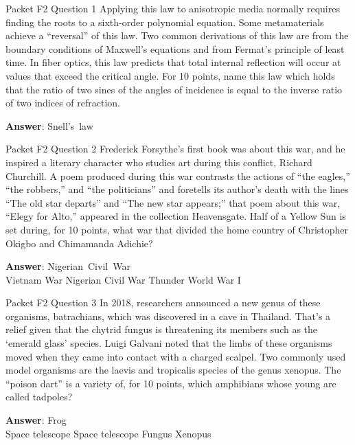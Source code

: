 \begin{frame}{Packet F2 Question 1}
Applying this law to anisotropic media normally     requires finding the roots to a sixth-order polynomial equation. Some metamaterials achieve a “reversal” of this law. Two common derivations of this law are from the boundary conditions of Maxwell’s equations and from Fermat’s principle of least time. In fiber optics, this law predicts that total internal reflection will occur at values     that exceed the critical angle. For 10 points, name this law which holds that the ratio of two sines of the angles of incidence is equal to the inverse ratio of two indices of refraction.

\textbf{Answer}: Snell's\ law\\
\end{frame}

\begin{frame}{Packet F2 Question 2}
Frederick Forsythe’s first book was about this war, and he inspired a literary character   who studies art during this conflict, Richard Churchill. A poem produced during this war contrasts the actions of “the eagles,” “the robbers,” and “the politicians” and foretells its author’s death with the lines “The old star departs” and “The new star appears;” that poem about this war, “Elegy for Alto,” appeared in the collection Heavensgate. Half of a Yellow Sun is set during, for 10 points, what war that divided the home country of Christopher Okigbo and Chimamanda Adichie?      

\textbf{Answer}: Nigerian\ Civil\ War\\
 Vietnam War
 Nigerian Civil War
 Thunder
 World War I
\end{frame}

\begin{frame}{Packet F2 Question 3}
In 2018, researchers announced     a new genus of these organisms, batrachians, which was discovered in a cave in Thailand. That's a relief given that the chytrid fungus is threatening its members such as the `emerald glass' species. Luigi Galvani noted that the limbs of these organisms moved when they came into contact with   a charged scalpel. Two commonly used model organisms are the laevis and tropicalis species of the genus xenopus. The “poison dart” is a variety of, for 10 points, which amphibians whose young are called tadpoles?  

\textbf{Answer}: Frog\\
 Space telescope
 Space telescope
 Fungus
 Xenopus
\end{frame}

